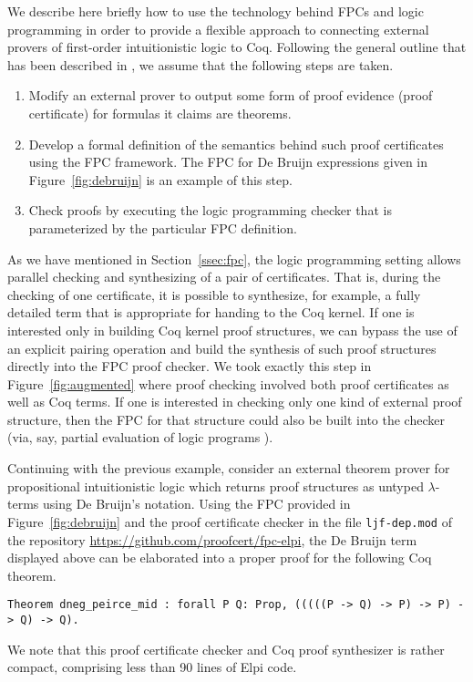 We describe here briefly how to use the technology behind FPCs and
logic programming in order to provide a flexible approach to
connecting external provers of first-order intuitionistic logic to
Coq.  Following the general outline that has been described in
\cite{blanco17cade,blanco20coq}, we assume that the following steps are
taken.
\begin{enumerate}
\item Modify an external prover to output some form of proof evidence
  (proof certificate) for formulas it claims are theorems.

\item Develop a formal definition of the semantics behind such proof
  certificates using the FPC framework.  The FPC for De Bruijn
  expressions given in Figure~\ref{fig:debruijn} is an example of this
  step.

\item Check proofs by executing the logic programming checker that is
  parameterized by the particular FPC definition.
\end{enumerate}
As we have mentioned in Section~\ref{ssec:fpc}, the logic programming
setting allows parallel checking and synthesizing of a pair of
certificates.  That is, during the checking of one certificate, it is
possible to synthesize, for example, a fully detailed term that is
appropriate for handing to the Coq kernel.
If one is interested only in building Coq kernel proof structures, we
can bypass the use of an explicit pairing operation and build the
synthesis of such proof structures directly into the FPC proof
checker.  We took exactly this step in Figure~\ref{fig:augmented}
where proof checking involved both proof certificates as well as
Coq terms.  If one is interested in checking only one kind
of external proof structure, then the FPC for that structure could
also be built into the checker (via, say, partial evaluation of logic
programs \cite{lloyd91jlp}).

Continuing with the previous example, consider an external theorem
prover for propositional intuitionistic logic which returns proof
structures as untyped $\lambda$-terms using De Bruijn's notation.
Using the FPC provided in Figure~\ref{fig:debruijn} and the proof
certificate checker in the file \verb+ljf-dep.mod+ of the repository
\url{https://github.com/proofcert/fpc-elpi}, the De Bruijn term
displayed above can be elaborated into a proper proof for the
following Coq theorem.

\begin{lstlisting}[basicstyle=\ttfamily,language=coq]
Theorem dneg_peirce_mid : forall P Q: Prop, (((((P -> Q) -> P) -> P) -> Q) -> Q).
\end{lstlisting}

We note that this proof certificate checker and Coq proof synthesizer
is rather compact, comprising less than 90 lines of Elpi code.


